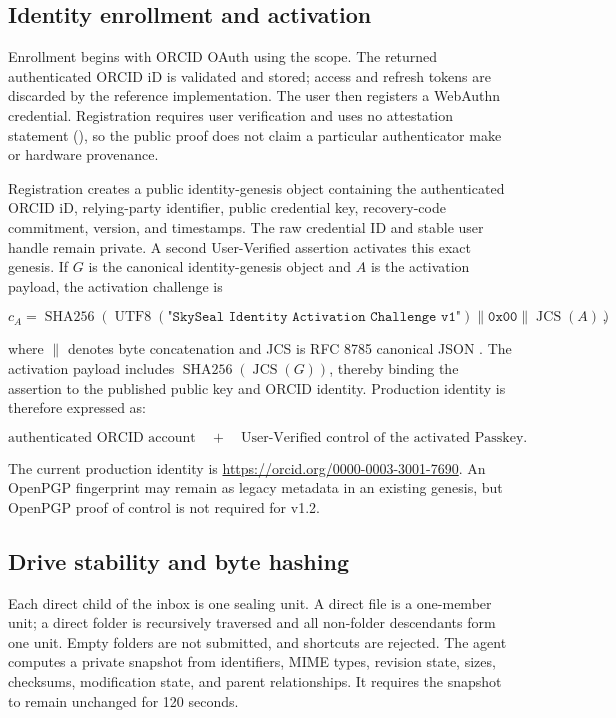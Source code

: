 \documentclass[11pt,a4paper]{article}
\newcommand{\code}[1]{\texttt{\detokenize{#1}}}
\newcommand{\sha}{\operatorname{SHA256}}
\newcommand{\jcs}{\operatorname{JCS}}
\begin{document}
\subsection{Identity enrollment and activation}

Enrollment begins with ORCID OAuth using the \code{/authenticate} scope. The returned authenticated ORCID iD is validated and stored; access and refresh tokens are discarded by the reference implementation. The user then registers a WebAuthn credential. Registration requires user verification and uses no attestation statement (\code{attestation = none}), so the public proof does not claim a particular authenticator make or hardware provenance.

Registration creates a public identity-genesis object containing the authenticated ORCID iD, relying-party identifier, public credential key, recovery-code commitment, version, and timestamps. The raw credential ID and stable user handle remain private. A second User-Verified assertion activates this exact genesis. If $G$ is the canonical identity-genesis object and $A$ is the activation payload, the activation challenge is

\begin{equation}
c_A = \sha\!\left(
  \operatorname{UTF8}(\texttt{"SkySeal Identity Activation Challenge v1"})
  \parallel \mathtt{0x00} \parallel \jcs(A)
\right),
\end{equation}

where $\parallel$ denotes byte concatenation and JCS is RFC 8785 canonical JSON \cite{rfc8785}. The activation payload includes $\sha(\jcs(G))$, thereby binding the assertion to the published public key and ORCID identity. Production identity is therefore expressed as:

\begin{equation}
\text{authenticated ORCID account}
\quad + \quad
\text{User-Verified control of the activated Passkey}.
\end{equation}

The current production identity is \url{https://orcid.org/0000-0003-3001-7690}. An OpenPGP fingerprint may remain as legacy metadata in an existing genesis, but OpenPGP proof of control is not required for v1.2.

\subsection{Drive stability and byte hashing}

Each direct child of the inbox is one sealing unit. A direct file is a one-member unit; a direct folder is recursively traversed and all non-folder descendants form one unit. Empty folders are not submitted, and shortcuts are rejected. The agent computes a private snapshot from identifiers, MIME types, revision state, sizes, checksums, modification state, and parent relationships. It requires the snapshot to remain unchanged for 120 seconds.
\end{document}
